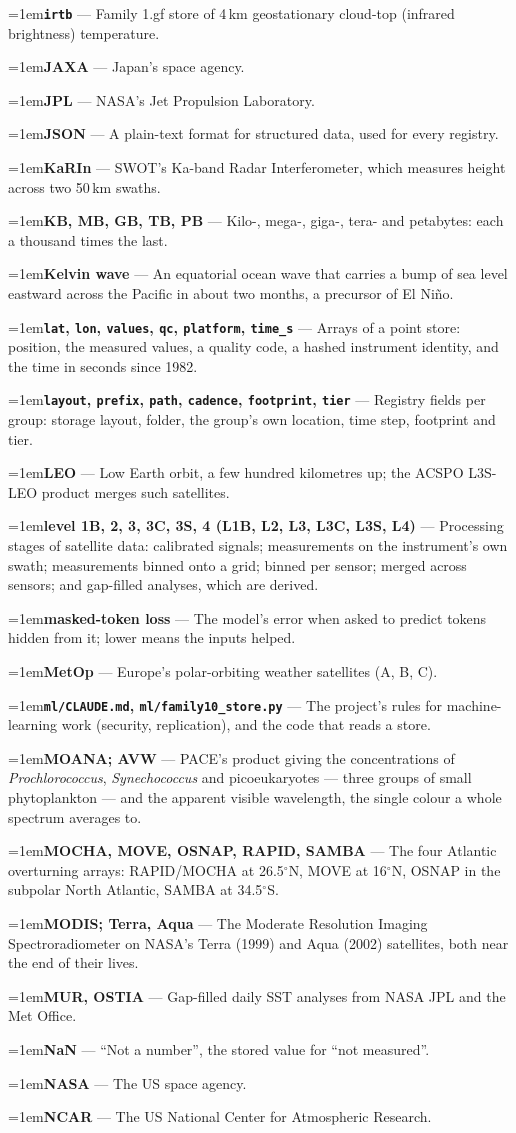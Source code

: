 \documentclass[10pt]{article}
\newcommand{\code}[1]{\texttt{#1}}
\newcommand{\gl}[2]{\par\hangindent=1em\hangafter=1\textbf{#1} --- #2\par}
\begin{document}
\gl{\code{irtb}}{Family 1.gf store of 4\,km geostationary cloud-top (infrared brightness) temperature.}
\gl{JAXA}{Japan's space agency.}
\gl{JPL}{NASA's Jet Propulsion Laboratory.}
\gl{JSON}{A plain-text format for structured data, used for every registry.}
\gl{KaRIn}{SWOT's Ka-band Radar Interferometer, which measures height across two 50\,km swaths.}
\gl{KB, MB, GB, TB, PB}{Kilo-, mega-, giga-, tera- and petabytes: each a thousand times the last.}
\gl{Kelvin wave}{An equatorial ocean wave that carries a bump of sea level eastward across the Pacific in about two months, a precursor of El Ni\~no.}
\gl{\code{lat}, \code{lon}, \code{values}, \code{qc}, \code{platform}, \code{time\_s}}{Arrays of a point store: position, the measured values, a quality code, a hashed instrument identity, and the time in seconds since 1982.}
\gl{\code{layout}, \code{prefix}, \code{path}, \code{cadence}, \code{footprint}, \code{tier}}{Registry fields per group: storage layout, folder, the group's own location, time step, footprint and tier.}
\gl{LEO}{Low Earth orbit, a few hundred kilometres up; the ACSPO L3S-LEO product merges such satellites.}
\gl{level 1B, 2, 3, 3C, 3S, 4 (L1B, L2, L3, L3C, L3S, L4)}{Processing stages of satellite data: calibrated signals; measurements on the instrument's own swath; measurements binned onto a grid; binned per sensor; merged across sensors; and gap-filled analyses, which are derived.}
\gl{masked-token loss}{The model's error when asked to predict tokens hidden from it; lower means the inputs helped.}
\gl{MetOp}{Europe's polar-orbiting weather satellites (A, B, C).}
\gl{\code{ml/CLAUDE.md}, \code{ml/family10\_store.py}}{The project's rules for machine-learning work (security, replication), and the code that reads a store.}
\gl{MOANA; AVW}{PACE's product giving the concentrations of \emph{Prochlorococcus}, \emph{Synechococcus} and picoeukaryotes --- three groups of small phytoplankton --- and the apparent visible wavelength, the single colour a whole spectrum averages to.}
\gl{MOCHA, MOVE, OSNAP, RAPID, SAMBA}{The four Atlantic overturning arrays: RAPID/MOCHA at 26.5$^\circ$N, MOVE at 16$^\circ$N, OSNAP in the subpolar North Atlantic, SAMBA at 34.5$^\circ$S.}
\gl{MODIS; Terra, Aqua}{The Moderate Resolution Imaging Spectroradiometer on NASA's Terra (1999) and Aqua (2002) satellites, both near the end of their lives.}
\gl{MUR, OSTIA}{Gap-filled daily SST analyses from NASA JPL and the Met Office.}
\gl{NaN}{``Not a number'', the stored value for ``not measured''.}
\gl{NASA}{The US space agency.}
\gl{NCAR}{The US National Center for Atmospheric Research.}
\end{document}
